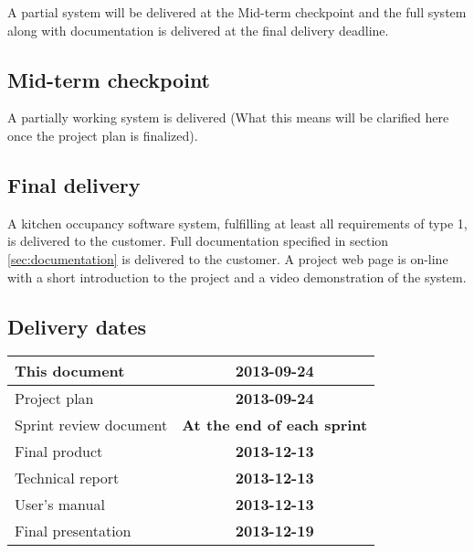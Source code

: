 A partial system will be delivered at the Mid-term checkpoint and the full system along with documentation is delivered at the final delivery deadline.

\subsection{Mid-term checkpoint}
A partially working system is delivered (What this means will be clarified here once the project plan is finalized).

\subsection{Final delivery}
A kitchen occupancy software system, fulfilling at least all requirements of type 1, is delivered to the customer.
Full documentation specified in section \ref{sec:documentation} is delivered to the customer.
A project web page is on-line with a short introduction to the project and a video demonstration of the system.

\subsection{Delivery dates}
\label{sec:delivery_req}
\begin{center}
	\begin{Large}
	\begin{tabular}{|p{10.5cm}|c|}
		\hline
		\large{This document} & \large{\textbf{2013-09-24}} \\
		\hline
		\large{Project plan} & \large{\textbf{2013-09-24}} \\
		\hline
		\large{Sprint review document} & \large{\textbf{At the end of each sprint}} \\
		\hline
		\large{Final product} & \large{\textbf{2013-12-13}} \\
		\hline
		\large{Technical report} & \large{\textbf{2013-12-13}} \\
		\hline
		\large{User's manual} & \large{\textbf{2013-12-13}} \\
		\hline
		\large{Final presentation} & \large{\textbf{2013-12-19}} \\
		\hline	
		
	\end{tabular}
	\end{Large}
\end{center}